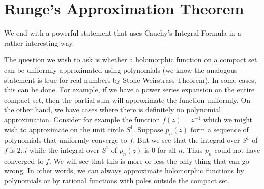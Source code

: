 \section{Runge's Approximation Theorem}
We end with a powerful statement that uses Cauchy's Integral Formula in a rather interesting way. 

The question we wish to ask is whether a holomorphic function on a compact set can be uniformly approximated using polynomials (we know the analogous statement is true for real numbers by Stone-Weirstrass Theorem). In some cases, this can be done. For example, if we have a power series expansion on the entire compact set, then the partial sum will approximate the function uniformly. On the other hand, we have cases where there is definitely no polynomial approximation. Consider for example the function $f(z) = z^{-1}$ which we might wish to approximate on the unit circle $S^1$. Suppose $p_n(z)$ form a sequence of polynomials that uniformly converge to $f$. But we see that the integral over $S^1$ of $f$ is $2\pi i$ while the integral over $S^1$ of $p_n(z)$ is $0$ for all $n$. Thus $p_n$ could not have converged to $f$. We will see that this is more or less the only thing that can go wrong. In other words, we can always approximate holomorphic functions by polynomials or by rational functions with poles outside the compact set.

